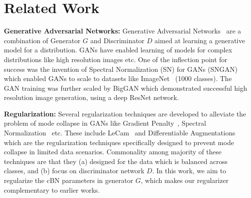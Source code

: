 \documentclass[runningheads,table]{llncs}
\begin{document}
\section{Related Work}
\noindent\textbf{Generative Adversarial Networks:} 
Generative Adversarial Networks~\cite{goodfellow2014generative} are a combination of Generator $G$ and Discriminator $D$ aimed at learning a generative model for a distribution. GANs have enabled learning of models for complex distributions like high resolution images etc. One of the inflection point for success was the invention of Spectral Normalization (SN) for GANs (SNGAN) which enabled GANs to scale to datasets like ImageNet~\cite{deng2009imagenet} (1000 classes). The GAN training was further scaled by BigGAN \cite{brock2018large} which demonstrated successful high resolution image generation, using a deep ResNet network. 

\noindent \textbf{Regularization:} Several regularization techniques \cite{zhang2019consistency, zhao2021improved, mao2019mode, kavalerov2019cgans, liu2019spectral, zhou2021omni} are developed to alleviate the problem of mode collapse in GANs like Gradient Penalty~\cite{gulrajani2017improved}, Spectral Normalization~\cite{miyato2018spectral} etc. These include LeCam~\cite{tseng2021regularizing} and Differentiable Augmentations~\cite{zhao2020differentiable, Karras2020ada} which are the regularization techniques specifically designed to prevent mode collapse in limited data scenarios. Commonality among majority of these techniques are that they (a) designed for the data which is balanced across classes, and (b) focus on discriminator network $D$. In this work, we aim to regularize the cBN parameters in generator $G$, which makes our regularizer complementary to earlier works.
\end{document}
